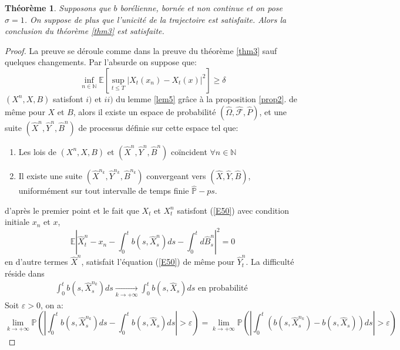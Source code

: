 \documentclass[A4paper,12pt]{report}
\newtheorem{theorem}{Th\'eor\`eme}[chapter]
\newcommand{\N}{{\mathbb{N}}}
\newcommand{\E}{{\mathbb{E}}}
\newcommand{\pr}{{\mathbb{P}}}
\begin{document}
\begin{theorem}
Supposons que $b$ borélienne, bornée et non continue et on pose $\sigma =1$. On suppose de plus que l'unicité de la trajectoire est satisfaite. Alors la conclusion du théorème \ref{thm3} est satisfaite.
\end{theorem} 
\begin{proof}
La preuve se déroule comme dans la preuve du théorème \ref{thm3} sauf quelques changements.
Par l'absurde on suppose que:
\begin{equation}
\inf _{n \in \mathbb{N}} \E\left[\sup _{t \leq T}\left|X_{t}\left(x_{n}\right)-X_{t}(x)\right|^{2}\right] \geq \delta
\end{equation}
$(X^n, X, B)$ satisfont $i)$ et $ii)$ du lemme \ref{lem5}  grâce à la proposition \ref{prop2}.
de même pour $X$ et $B$, alors il existe un espace de probabilité $(\widehat{\Omega}, \widehat{\mathcal{F}}, \widehat{P})$, et une suite  $\left(\widehat{X}^{n}, \widehat{Y}^{n}, \widehat{B}^{n}\right)$ de processus définie sur cette espace tel que:
\begin{enumerate}
\item Les lois de $(X^n, X, B)$ et $(\widehat{X}^n, \widehat{Y}^n, \widehat{B}^n)$ coïncident  $\forall n \in \N $
\item Il existe une suite $(\widehat{X}^{n_k}, \widehat{Y}^{n_k}, \widehat{B}^{n_k})$ convergeant vers $(\widehat{X}, \widehat{Y}, \widehat{B})$, uniformément sur tout intervalle de temps finie $\widehat{\pr}-ps$. 
\end{enumerate}
d'après le premier point et le fait que $X_t$ et $X_t ^n$ satisfont (\ref{E50}) avec condition initiale $x_n$ et $x$,
$$
\E\left|\widehat{X}_{t}^{n}-x_{n} - \int_{0}^{t} b\left(s, \widehat{X}_{s}^{n}\right) d s -\int_{0}^{t} d \widehat{B}_{s}^{n} \right|^{2}=0
$$
en d'autre termes $\widehat{X}^n$, satisfait l'équation (\ref{E50}) de même pour $\widehat{Y}_t ^n$.
La difficulté réside dans 
$$
\begin{gathered}
\int_{0}^{t} b\left(s, \widehat{X}_{s}^{n_{k}}\right) d s \underset{k \rightarrow+\infty}{\longrightarrow} \int_{0}^{t} b\left(s, \widehat{X}_{s}\right) d s \text{ en probabilité }
\end{gathered}
$$
Soit $\varepsilon > 0$, on a: 
$$\lim_{k \rightarrow +\infty} \pr\left( \left| \int_0 ^t b(s, \widehat{X}_{s}^{n_{k}}) ds - \int_0 ^t b(s, \widehat{X}_{s}) ds \right| > \varepsilon \right)= \lim_{k \rightarrow +\infty} \pr\left( \left| \int_0 ^t (b(s, \widehat{X}_{s}^{n_{k}}) -  b(s, \widehat{X}_{s})) ds \right| > \varepsilon \right) $$ 

\end{proof}
\end{document}
